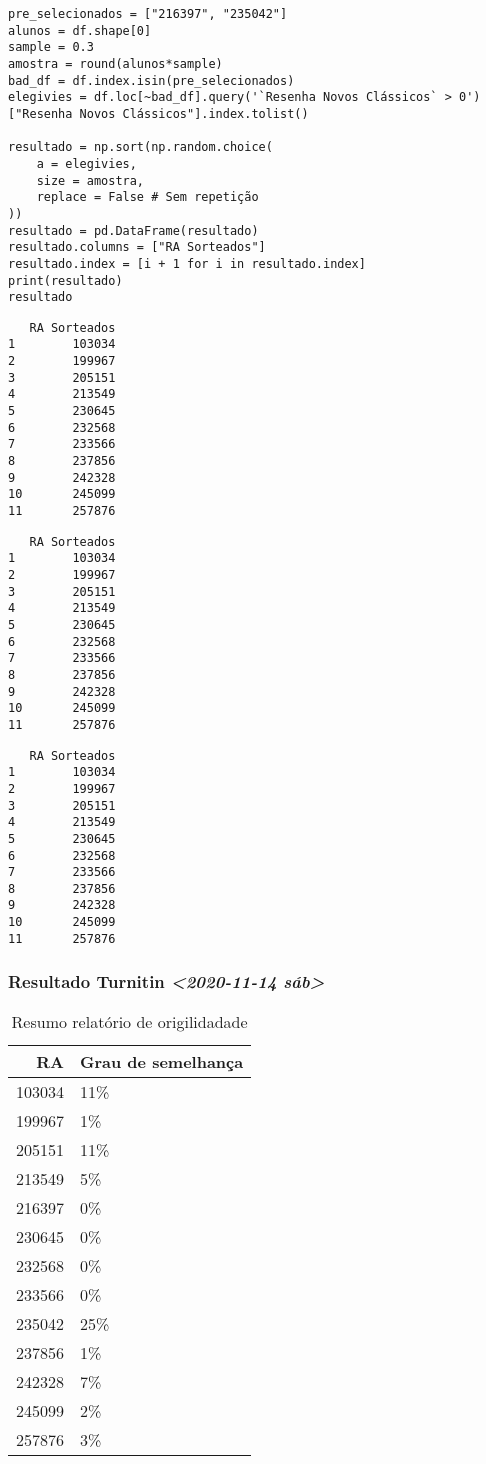 \documentclass[11pt]{article}
\begin{document}
\begin{verbatim}
pre_selecionados = ["216397", "235042"]
alunos = df.shape[0]
sample = 0.3
amostra = round(alunos*sample)
bad_df = df.index.isin(pre_selecionados)
elegivies = df.loc[~bad_df].query('`Resenha Novos Clássicos` > 0')["Resenha Novos Clássicos"].index.tolist()

resultado = np.sort(np.random.choice(
    a = elegivies,
    size = amostra,
    replace = False # Sem repetição
))
resultado = pd.DataFrame(resultado)
resultado.columns = ["RA Sorteados"]
resultado.index = [i + 1 for i in resultado.index]
print(resultado)
resultado
\end{verbatim}

\begin{verbatim}
   RA Sorteados
1        103034
2        199967
3        205151
4        213549
5        230645
6        232568
7        233566
8        237856
9        242328
10       245099
11       257876
\end{verbatim}
\begin{verbatim}
   RA Sorteados
1        103034
2        199967
3        205151
4        213549
5        230645
6        232568
7        233566
8        237856
9        242328
10       245099
11       257876
\end{verbatim}
\begin{verbatim}
   RA Sorteados
1        103034
2        199967
3        205151
4        213549
5        230645
6        232568
7        233566
8        237856
9        242328
10       245099
11       257876
\end{verbatim}



\subsubsection{Resultado Turnitin \textit{<2020-11-14 sáb>}}
\label{sec:org996d650}

\begin{table}[htbp]
\caption{\label{TurnitinNvC}Resumo relatório de origilidadade}
\centering
\begin{tabular}{rl}
\hline
RA & Grau de semelhança\\
\hline
103034 & 11\%\\
199967 & 1\%\\
205151 & 11\%\\
213549 & 5\%\\
216397 & 0\%\\
230645 & 0\%\\
232568 & 0\%\\
233566 & 0\%\\
235042 & 25\%\\
237856 & 1\%\\
242328 & 7\%\\
245099 & 2\%\\
257876 & 3\%\\
\hline
\end{tabular}
\end{table}
\end{document}
